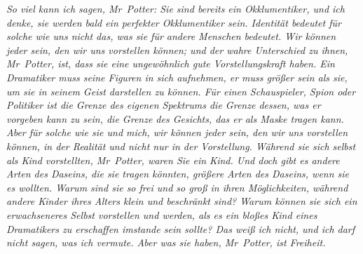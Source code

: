 \emph{So viel kann ich sagen, Mr~Potter: Sie sind bereits ein Okklumentiker, und ich denke, sie werden bald ein perfekter Okklumentiker sein. Identität bedeutet für solche wie uns nicht das, was sie für andere Menschen bedeutet. Wir können jeder sein, den wir uns vorstellen können; und der wahre Unterschied zu ihnen, Mr~Potter, ist, dass sie eine ungewöhnlich gute Vorstellungskraft haben. Ein Dramatiker muss seine Figuren in sich aufnehmen, er muss größer sein als sie, um sie in seinem Geist darstellen zu können. Für einen Schauspieler, Spion oder Politiker ist die Grenze des eigenen Spektrums die Grenze dessen, was er vorgeben kann zu sein, die Grenze des Gesichts, das er als Maske tragen kann. Aber für solche wie sie und mich, wir können jeder \emph{sein}, den wir uns vorstellen können, in der Realität und nicht nur in der Vorstellung. Während sie sich selbst als Kind vorstellten, Mr~Potter, \emph{waren} Sie ein Kind. Und doch gibt es andere Arten des Daseins, die sie tragen könnten, größere Arten des Daseins, wenn sie es wollten. Warum sind sie so frei und so groß in ihren Möglichkeiten, während andere Kinder ihres Alters klein und beschränkt sind? Warum können sie sich ein erwachseneres Selbst vorstellen und \emph{werden}, als es ein bloßes Kind eines Dramatikers zu erschaffen imstande sein sollte? Das weiß ich nicht, und ich darf nicht sagen, was ich vermute. Aber was sie haben, Mr~Potter, ist Freiheit.}

